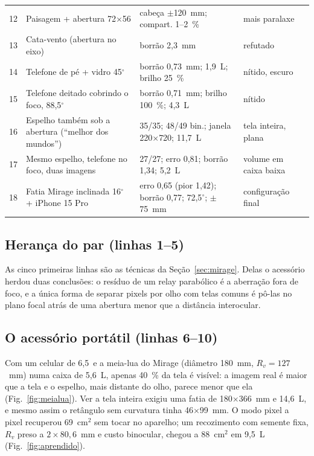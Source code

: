 \documentclass[journal,10pt]{IEEEtran}
\begin{document}
\begin{table}[t]
\begin{tabular}{@{}lp{6.2cm}p{6.2cm}p{3.2cm}@{}}
12 & Paisagem + abertura 72$\times$56 & cabe\c{c}a $\pm$120~mm; compart. 1--2~\% & mais paralaxe \\
13 & Cata-vento (abertura no eixo) & borr\~ao 2,3~mm & refutado \\
14 & Telefone de p\'e + vidro 45$^\circ$ & borr\~ao 0,73~mm; 1,9~L; brilho 25~\% & n\'itido, escuro \\
15 & Telefone deitado cobrindo o foco, 88,5$^\circ$ & borr\~ao 0,71~mm; brilho 100~\%; 4,3~L & n\'itido \\
16 & Espelho tamb\'em sob a abertura (``melhor dos mundos'') & 35/35; 48/49 bin.; janela 220$\times$720; 11,7~L & tela inteira, plana \\
17 & Mesmo espelho, telefone no foco, duas imagens & 27/27; erro 0,81; borr\~ao 1,34; 5,2~L & volume em caixa baixa \\
18 & Fatia Mirage inclinada 16$^\circ$ + iPhone 15 Pro & erro 0,65 (pior 1,42); borr\~ao 0,77; 72,5$^\circ$; $\pm$75~mm & configura\c{c}\~ao final \\
\bottomrule
\end{tabular}
\end{table}

\subsection{Heran\c{c}a do par (linhas 1--5)}
As cinco primeiras linhas s\~ao as t\'ecnicas da Se\c{c}\~ao~\ref{sec:mirage}. Delas o acess\'orio herdou duas conclus\~oes: o res\'iduo de um relay parab\'olico \'e a aberra\c{c}\~ao fora de foco, e a \'unica forma de separar pixels por olho com telas comuns \'e p\^o-las no plano focal atr\'as de uma abertura menor que a dist\^ancia interocular.

\subsection{O acess\'orio port\'atil (linhas 6--10)}
Com um celular de 6,5\,\textquotedbl{} e a meia-lua do Mirage (di\^ametro 180~mm, $R_v = 127$~mm) numa caixa de 5,6~L, apenas 40~\% da tela \'e vis\'ivel: a imagem real \'e maior que a tela e o espelho, mais distante do olho, parece menor que ela (Fig.~\ref{fig:meialua}). Ver a tela inteira exigiu uma fatia de 180$\times$366~mm e 14,6~L, e mesmo assim o ret\^angulo sem curvatura tinha 46$\times$99~mm. O modo pixel a pixel recuperou 69~cm$^2$ sem tocar no aparelho; um recozimento com semente fixa, $R_v$ preso a $2\times80{,}6$~mm e custo binocular, chegou a 88~cm$^2$ em 9,5~L (Fig.~\ref{fig:aprendido}).
\end{document}
